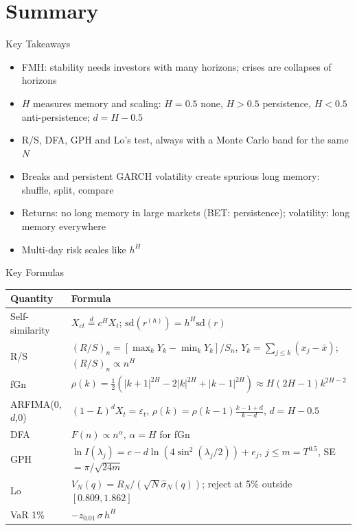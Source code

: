 \section{Summary}

\begin{frame}{Key Takeaways}
\itemsize{\small}
\begin{itemize}
    \item FMH: stability needs investors with many horizons; crises are collapses of horizons
    \item $H$ measures memory and scaling: $H = 0.5$ none, $H > 0.5$ persistence, $H < 0.5$ anti-persistence; $d = H - 0.5$
    \item R/S, DFA, GPH and Lo's test, always with a Monte Carlo band for the same $N$
    \item Breaks and persistent GARCH volatility create spurious long memory: shuffle, split, compare
    \item Returns: no long memory in large markets (BET: persistence); volatility: long memory everywhere
    \item Multi-day risk scales like $h^H$
\end{itemize}
\end{frame}

\begin{frame}{Key Formulas}
\itemsize{\small}
{\renewcommand{\arraystretch}{1.45}\begin{center}
\small
\begin{tabular}{ll}
\toprule
\textbf{Quantity} & \textbf{Formula} \\
\midrule
Self-similarity & $X_{ct} \overset{d}{=} c^H X_t$; \quad $\mathrm{sd}(r^{(h)}) = h^H \mathrm{sd}(r)$ \\
R/S & $(R/S)_n = \left[\max_k Y_k - \min_k Y_k\right]/S_n$, \quad $Y_k = \sum_{j \le k}(x_j - \bar x)$; \quad $(R/S)_n \propto n^H$ \\
fGn & $\rho(k) = \tfrac12(|k + 1|^{2H} - 2|k|^{2H} + |k - 1|^{2H}) \approx H(2H - 1)k^{2H - 2}$ \\
ARFIMA(0,$d$,0) & $(1 - L)^d X_t = \varepsilon_t$, \quad $\rho(k) = \rho(k - 1)\frac{k - 1 + d}{k - d}$, \quad $d = H - 0.5$ \\
DFA & $F(n) \propto n^{\alpha}$, \quad $\alpha = H$ for fGn \\
GPH & $\ln I(\lambda_j) = c - d\ln(4\sin^2(\lambda_j/2)) + e_j$, \quad $j \le m = T^{0.5}$, \quad SE $= \pi/\sqrt{24m}$ \\
Lo & $V_N(q) = R_N/(\sqrt{N}\hat\sigma_N(q))$; reject at 5\% outside $[0.809, 1.862]$ \\
VaR 1\% & $-z_{0.01}\,\sigma\,h^H$ \\
\bottomrule
\end{tabular}
\end{center}
}
\end{frame}

